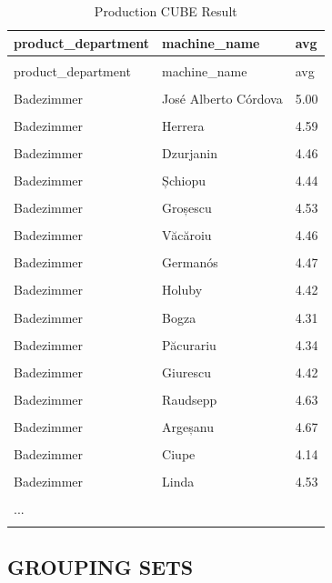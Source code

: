 \documentclass[letterpaper,12pt]{article}
\begin{document}
\begingroup
\renewcommand\arraystretch{0.5}
\begin{longtable}{p{4cm}p{4cm}p{4cm}}
        \caption{Production CUBE Result} \\
				product\_department & machine\_name & avg \\
        \endfirsthead \\
        product\_department & machine\_name & avg \\
        \endhead \\
Badezimmer & José Alberto Córdova & 5.00 \\
\hline \\
Badezimmer & Herrera & 4.59 \\
\hline \\
Badezimmer & Dzurjanin & 4.46 \\
\hline \\
Badezimmer & Șchiopu & 4.44 \\
\hline \\
Badezimmer & Groșescu & 4.53 \\
\hline \\
Badezimmer & Văcăroiu & 4.46 \\
\hline \\
Badezimmer & Germanós & 4.47 \\
\hline \\
Badezimmer & Holuby & 4.42 \\
\hline \\
Badezimmer & Bogza & 4.31 \\
\hline \\
Badezimmer & Păcurariu & 4.34 \\
\hline \\
Badezimmer & Giurescu & 4.42 \\
\hline \\
Badezimmer & Raudsepp & 4.63 \\
\hline \\
Badezimmer & Argeșanu & 4.67 \\
\hline \\
Badezimmer & Ciupe & 4.14 \\
\hline \\
Badezimmer & Linda & 4.53 \\
\hline \\
... \\
\hline \\
\end{longtable} 
\endgroup  

\subsection{GROUPING SETS}
\end{document}
